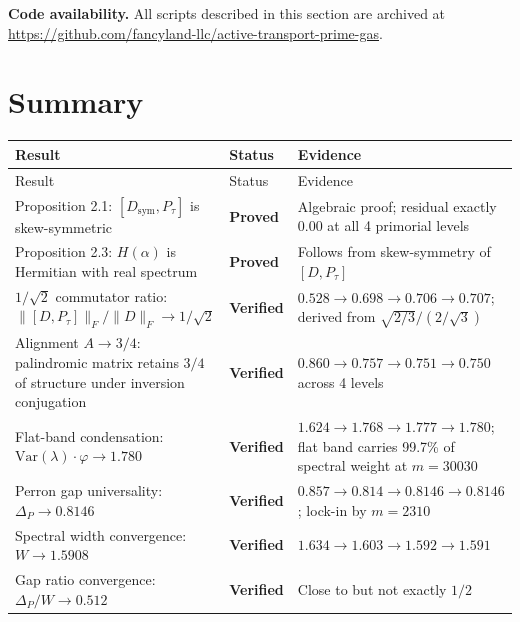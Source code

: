 \documentclass[11pt,letterpaper]{article}
\theoremstyle{definition}
\theoremstyle{remark}
\begin{document}
\textbf{Code availability.} All scripts described in this section are archived at \url{https://github.com/fancyland-llc/active-transport-prime-gas}.

\section{Summary}\label{summary}

\begin{longtable}[]{@{}
  >{\raggedright\arraybackslash}p{}
  >{\raggedright\arraybackslash}p{}
  >{\raggedright\arraybackslash}p{}@{}}
\toprule
Result & Status & Evidence \\
\midrule
\endfirsthead
\toprule
Result & Status & Evidence \\
\midrule
\endhead
Proposition 2.1: $[D_{\text{sym}}, P_\tau]$ is skew-symmetric & \textbf{Proved} & Algebraic proof; residual exactly 0.00 at all 4 primorial levels \\
Proposition 2.3: $H(\alpha)$ is Hermitian with real spectrum & \textbf{Proved} & Follows from skew-symmetry of $[D, P_\tau]$ \\
$1/\sqrt{2}$ commutator ratio: $\|[D,P_\tau]\|_F / \|D\|_F \to 1/\sqrt{2}$ & \textbf{Verified} & $0.528 \to 0.698 \to 0.706 \to 0.707$; derived from $\sqrt{2/3} / (2/\sqrt{3})$ \\
Alignment $A \to 3/4$: palindromic matrix retains $3/4$ of structure under inversion conjugation & \textbf{Verified} & $0.860 \to 0.757 \to 0.751 \to 0.750$ across 4 levels \\
Flat-band condensation: $\text{Var}(\lambda) \cdot \varphi \to 1.780$ & \textbf{Verified} & $1.624 \to 1.768 \to 1.777 \to 1.780$; flat band carries 99.7\% of spectral weight at $m = 30030$ \\
Perron gap universality: $\Delta_P \to 0.8146$ & \textbf{Verified} & $0.857 \to 0.814 \to 0.8146 \to 0.8146$; lock-in by $m = 2310$ \\
Spectral width convergence: $W \to 1.5908$ & \textbf{Verified} & $1.634 \to 1.603 \to 1.592 \to 1.591$ \\
Gap ratio convergence: $\Delta_P / W \to 0.512$ & \textbf{Verified} & Close to but not exactly $1/2$ \\

\end{longtable}
\end{document}
